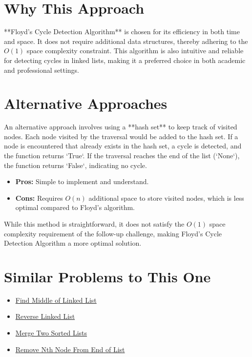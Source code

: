 \section*{Why This Approach}
**Floyd's Cycle Detection Algorithm** is chosen for its efficiency in both time and space. It does not require additional data structures, thereby adhering to the \(O(1)\) space complexity constraint. This algorithm is also intuitive and reliable for detecting cycles in linked lists, making it a preferred choice in both academic and professional settings.

\section*{Alternative Approaches}
An alternative approach involves using a **hash set** to keep track of visited nodes. Each node visited by the traversal would be added to the hash set. If a node is encountered that already exists in the hash set, a cycle is detected, and the function returns `True`. If the traversal reaches the end of the list (`None`), the function returns `False`, indicating no cycle.

\begin{itemize}
    \item \textbf{Pros:} Simple to implement and understand.
    \item \textbf{Cons:} Requires \(O(n)\) additional space to store visited nodes, which is less optimal compared to Floyd's algorithm.
\end{itemize}

While this method is straightforward, it does not satisfy the \(O(1)\) space complexity requirement of the follow-up challenge, making Floyd's Cycle Detection Algorithm a more optimal solution.

\section*{Similar Problems to This One}
\begin{itemize}
    \item \hyperref[problem:find_middle_of_linked_list]{Find Middle of Linked List}
    \item \hyperref[problem:reverse_linked_list]{Reverse Linked List}
    \item \hyperref[problem:merge_two_sorted_lists]{Merge Two Sorted Lists}
    \item \hyperref[problem:remove_nth_node_from_end_of_list]{Remove Nth Node From End of List}
\end{itemize}


